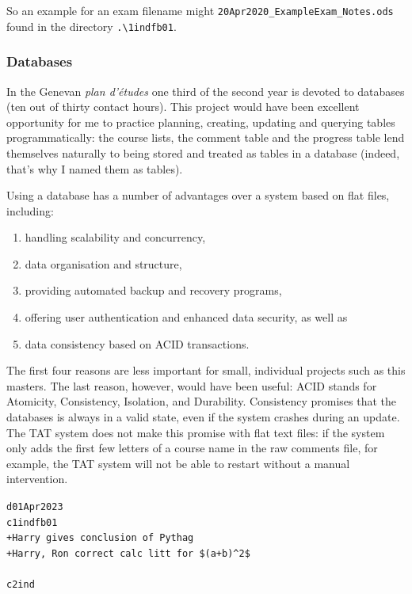 \documentclass[10pt]{article}
\begin{document}
So an example for an exam filename might \texttt{20Apr2020\_ExampleExam\_Notes.ods} found in the directory \texttt{.\textbackslash1indfb01}.


\subsubsection{Databases} \label{db}
In the Genevan \emph{plan d'études} one third of the second year is devoted to databases (ten out of thirty contact hours). This project would have been excellent opportunity for me to practice planning, creating, updating and querying tables programmatically: the course lists, the comment table and the progress table lend themselves naturally to being stored and treated as tables in a database (indeed, that's why I named them as tables).

Using a database has a number of advantages over a system based on flat files, including:
\begin{enumerate}
\item handling scalability and concurrency, 
\item data organisation and structure,
\item providing automated backup and recovery programs,
\item offering user authentication and enhanced data security, as well as
\item data consistency based on ACID transactions.
\end{enumerate}
The first four reasons are less important for small, individual projects such as this masters. The last reason, however, would have been useful: ACID stands for Atomicity, Consistency, Isolation, and Durability. Consistency promises that the databases is always in a valid state, even if the system crashes during an update. The TAT system does not make this promise with flat text files: if the system only adds the first few letters of a course name in the raw comments file, for example, the TAT system will not be able to restart without a manual intervention.

\begin{tcolorbox}[title = comments\_file\_BROKEN.txt]
\texttt{d01Apr2023\\c1indfb01\\+Harry gives conclusion of Pythag\\+Harry, Ron correct calc litt for \$(a+b)\textasciicircum2\$\\\\c2ind}
\end{tcolorbox}
\end{document}
